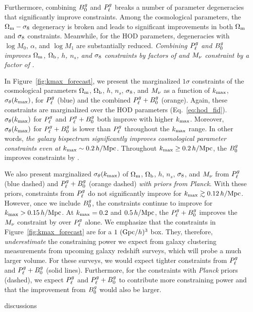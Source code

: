 Furthermore, combining $B^g_0$ and $P^g_{\ell}$ breaks a number of parameter
degeneracies that significantly improve constraints. Among the cosmological
parameters, the $\Omega_{\rm m}-\sigma_8$ degeneracy is broken and leads to significant
improvements in both $\Omega_{\rm m}$ and $\sigma_8$ constraints. Meanwhile, for the HOD 
parameters, degeneracies with $\log M_0$, $\alpha$, and $\log M_1$ are 
substantially reduced. {\em Combining $P^g_{\ell}$ and $B^g_0$ improves $\Omega_{\rm m}$, $\Omega_{\rm b}$, $h$,
$n_s$, and $\sigma_8$ constraints by factors of 
and $M_\nu$ constraint by a factor of .}

In Figure~\ref{fig:kmax_forecast}, we present the marginalized $1\sigma$
constraints of the cosmological parameters $\Omega_{\rm m}$, $\Omega_{\rm b}$, $h$, $n_s$, $\sigma_8$,
and $M_\nu$ as a function of $k_{\rm max}$, $\sigma_\theta(k_{\rm max})$, for $P^g_{\ell}$ (blue)
and the combined $P^g_{\ell} + B^g_0$ (orange). Again, these constraints are
marginalized over the \cite{zheng2007} HOD parameters (Eq.~\ref{eq:hod_fid}). 
$\sigma_\theta(k_{\rm max})$ for $P^g_{\ell}$ and $P^g_{\ell} + B^g_0$ both improve with higher
$k_{\rm max}$. Moreover, $\sigma_\theta(k_{\rm max})$ for $P^g_{\ell}+B^g_0$ is lower than $P^g_{\ell}$
throughout the $k_{\rm max}$ range. In other words, {\em the galaxy bispectrum 
significantly improves cosmological parameter constraints even at
$k_{\rm max}\sim0.2\,h/\mathrm{Mpc}$}. Throughout $k_{\rm max} \ge 0.2\,h/\mathrm{Mpc}$, the $B^g_0$ improves constraints by  
.

We also present marginalized $\sigma_\theta(k_{\rm max})$ of $\Omega_{\rm m}$, $\Omega_{\rm b}$, $h$, $n_s$,
$\sigma_8$, and $M_\nu$ from $P^g_{\ell}$ (blue dashed) and $P^g_{\ell} + B^g_0$ (orange dashed) 
{\em with priors from Planck}. With these priors, constraints from $P^g_{\ell}$ do 
not significantly improve for $k_{\rm max} \gtrsim 0.12\,h/\mathrm{Mpc}$. However, once we include 
$B^g_0$, the constraints continue to improve for $k_{\rm max} > 0.15\,h/\mathrm{Mpc}$. At $k_{\rm max} =
0.2$ and $0.5\,h/\mathrm{Mpc}$, the $P^g_{\ell} + B^g_0$ improves the $M_\nu$ constraint by 
over $P^g_{\ell}$ alone. We emphasize that the constraints in Figure~\ref{fig:kmax_forecast} 
are for a $1~({\rm Gpc}/h)^3$ box. They, therefore, {\em underestimate} the 
constraining power we expect from galaxy clustering measurements from upcoming
galaxy redshift surveys, which will probe a much larger volume. For
these surveys, we would expect tighter constraints from $P^g_{\ell}$ and $P^g_{\ell}+B^g_0$
(solid lines). Furthermore, for the constraints with {\em Planck} priors (dashed), we 
expect $P^g_{\ell}$ and $P^g_{\ell}+B^g_0$ to contribute more constraining power and that the
improvement from $B^g_0$ would also be larger. 

discussions

